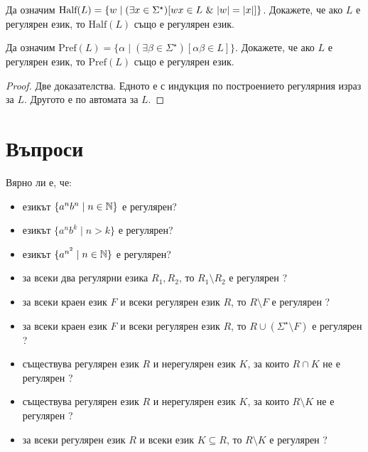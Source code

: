 \begin{problem}
  Да означим $\mbox{Half}(L) = \{w\mid (\exists x \in \Sigma^\star)[wx \in L\ \&\ \vert{w}\vert = \vert{x}\vert]\}$.
  Докажете, че ако $L$ е регулярен език, то $\mbox{Half}(L)$ също е регулярен език.
\end{problem}

\begin{problem}
  Да означим $\mbox{Pref}(L) = \{\alpha \mid (\exists \beta \in \Sigma^\star)[\alpha\beta \in L]\}$.
  Докажете, че ако $L$ е регулярен език, то $\mbox{Pref}(L)$ също е регулярен език.
\end{problem}
\begin{proof}
  Две доказателства. Едното е с индукция по построението регулярния израз за $L$.
  Другото е по автомата за $L$.
\end{proof}


\section{Въпроси}

Вярно ли е, че:
\begin{itemize}
\item
  езикът $\{a^nb^n\mid n \in \mathbb{N} \}$ е регулярен?
\item
  езикът $\{a^nb^k\mid n > k\}$ е регулярен?
\item
  езикът $\{a^{n^2}\mid n \in \mathbb{N}\}$ е регулярен?
\item
  за всеки два регулярни езика $R_1, R_2$, то $R_1 \setminus R_2$ е регулярен ?
\item
  за всеки краен език $F$ и всеки регулярен език $R$, то $R\setminus F$ е регулярен ?
\item
  за всеки краен език $F$ и всеки регулярен език $R$, то $R\cup (\Sigma^\star \setminus F)$ е регулярен ?
\item
  съществува регулярен език $R$ и нерегулярен език $K$, за които $R\cap K$ не е регулярен ?
\item
  съществува регулярен език $R$ и нерегулярен език $K$, за които $R\setminus K$ не е регулярен ?
\item
  за всеки регулярен език $R$ и всеки език $K \subseteq R$, то $R\setminus K$ е регулярен ?
\end{itemize}
